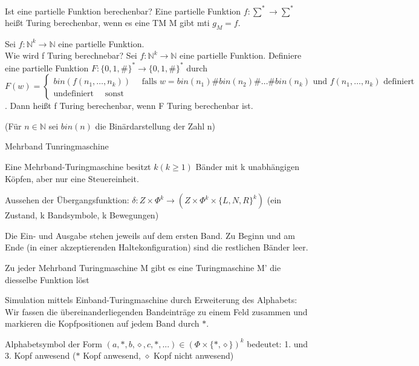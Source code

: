 \documentclass[avery5371, frame]{flashcards}
\begin{document}
\begin{flashcard}[Definition]{Ist eine partielle Funktion berechenbar?}
    Eine partielle Funktion $f:\sum^*\rightarrow\sum^*$ heißt Turing berechenbar, wenn es eine TM M gibt mti $g_M=f$.
\end{flashcard}

\begin{flashcard}[Definition]{Sei $f:\mathbb{N}^k\rightarrow\mathbb{N}$ eine partielle Funktion.\\ Wie wird f Turing berechnebar?}
    Sei $f:\mathbb{N}^k\rightarrow\mathbb{N}$ eine partielle Funktion. Definiere eine partielle Funktion $F:\{0,1,\#\}^*\rightarrow\{0,1,\#\}^*$ durch $F(w)=\begin{cases} bin(f(n_1,\dots ,n_k)) \quad\text{ falls } w=bin(n_1)\#bin(n_2)\#\dots \#bin(n_k) \text{ und } f(n_1,\dots,n_k) \text{ definiert} \\ \text{undefiniert} \quad{\text{ sonst }}\end{cases}$. Dann heißt f Turing berechenbar, wenn F Turing berechenbar ist.

    (Für $n\in\mathbb{N}$ sei $bin(n)$ die Binärdarstellung der Zahl n)
\end{flashcard}

\begin{flashcard}[Definition]{Mehrband Tunringmaschine}
    \begin{itemize*}
        \item Eine Mehrband-Turingmaschine besitzt $k(k\geq 1)$ Bänder mit k unabhängigen Köpfen, aber nur eine Steuereinheit.
        \item Aussehen der Übergangsfunktion: $\delta:Z\times\Phi^k\rightarrow (Z\times\Phi^k\times\{L,N,R\}^k)$ (ein Zustand, k Bandsymbole, k Bewegungen)
        \item Die Ein- und Ausgabe stehen jeweils auf dem ersten Band. Zu Beginn und am Ende (in einer akzeptierenden Haltekonfiguration) sind die restlichen Bänder leer.
    \end{itemize*}
\end{flashcard}

\begin{flashcard}[Satz]{ Zu jeder Mehrband Turingmaschine M gibt es}
    eine Turingmaschine M' die diesselbe Funktion löst
    \begin{itemize*}
        \item Simulation mittels Einband-Turingmaschine durch Erweiterung des Alphabets: Wir fassen die übereinanderliegenden Bandeinträge zu einem Feld zusammen und markieren die Kopfpositionen auf jedem Band durch $\ast$. %
        \item Alphabetsymbol der Form $(a,\ast,b,\diamond,c,\ast,...)\in(\Phi\times\{\ast,\diamond\})^k$ bedeutet: 1. und 3. Kopf anwesend ($\ast$ Kopf anwesend, $\diamond$ Kopf nicht anwesend)
    \end{itemize*}
\end{flashcard}
\end{document}

